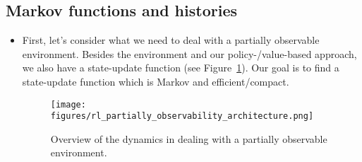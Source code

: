 \subsection{Markov functions and histories}
\begin{itemize}
	\item First, let's consider what we need to deal with a partially observable environment. Besides the environment and our policy-/value-based approach, we also have a state-update function (see Figure~\ref{fig:rl_partially_observability_architecture}). Our goal is to find a state-update function which is Markov and efficient/compact.
	
	\begin{figure}[ht!]
		\centering
		\texttt{[image: figures/rl\_partially\_observability\_architecture.png]}
		\caption{Overview of the dynamics in dealing with a partially observable environment.}
		\label{fig:rl_partially_observability_architecture}
	\end{figure}
\end{itemize}

